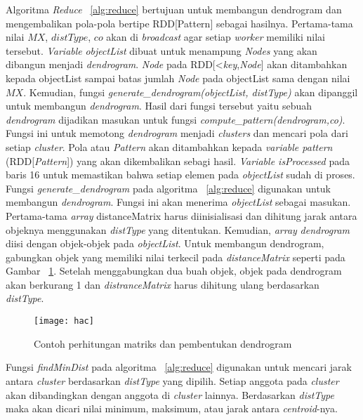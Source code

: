 Algoritma \textit{Reduce} ~\ref{alg:reduce} bertujuan untuk membangun dendrogram dan mengembalikan pola-pola bertipe RDD[Pattern] sebagai hasilnya. Pertama-tama nilai $MX$, $distType$, $co$ akan di \textit{broadcast} agar setiap \textit{worker} memiliki nilai tersebut. \textit{Variable} \textit{objectList} dibuat untuk menampung \textit{Nodes} yang akan dibangun menjadi \textit{dendrogram}. \textit{Node} pada RDD[<\textit{key},\textit{Node}] akan ditambahkan kepada objectList sampai batas jumlah \textit{Node} pada objectList sama dengan nilai $MX$. Kemudian, fungsi \textit{generate\_dendrogram(objectList, distType)} akan dipanggil untuk membangun \textit{dendrogram}. Hasil dari fungsi tersebut yaitu sebuah \textit{dendrogram} dijadikan masukan untuk fungsi \textit{compute\_pattern(dendrogram,co)}. Fungsi ini untuk memotong \textit{dendrogram} menjadi \textit{clusters} dan mencari pola dari setiap \textit{cluster}. Pola atau \textit{Pattern} akan ditambahkan kepada \textit{variable pattern} (RDD[\textit{Pattern}]) yang akan dikembalikan sebagi hasil. \textit{Variable isProcessed} pada baris 16 untuk memastikan bahwa setiap elemen pada \textit{objectList} sudah di proses. \\


Fungsi \textit{generate}\_\textit{dendrogram} pada algoritma ~\ref{alg:reduce} digunakan untuk membangun \textit{dendrogram}. Fungsi ini akan menerima \textit{objectList} sebagai masukan. Pertama-tama \textit{array} distanceMatrix harus diinisialisasi dan dihitung jarak antara objeknya menggunakan \textit{distType} yang ditentukan. Kemudian, \textit{array} \textit{dendrogram} diisi dengan objek-objek pada \textit{objectList}. Untuk membangun dendrogram, gabungkan objek yang memiliki nilai terkecil pada \textit{distanceMatrix} seperti pada Gambar ~\ref{fig:hac}. Setelah menggabungkan dua buah objek, objek pada dendrogram akan berkurang 1 dan \textit{distranceMatrix} harus dihitung ulang berdasarkan \textit{distType}.

\begin{figure}[H]
    \centering  
    \texttt{[image: hac]}  
    \caption[Contoh perhitungan matriks dan pembentukan dendrogram]{Contoh perhitungan matriks dan pembentukan dendrogram} 
    \label{fig:hac}
\end{figure}

Fungsi \textit{findMinDist} pada algoritma ~\ref{alg:reduce} digunakan untuk mencari jarak antara \textit{cluster} berdasarkan \textit{distType} yang dipilih. Setiap anggota pada \textit{cluster} akan dibandingkan dengan anggota di \textit{cluster} lainnya. Berdasarkan \textit{distType} maka akan dicari nilai minimum, maksimum, atau jarak antara \textit{centroid}-nya.\\

